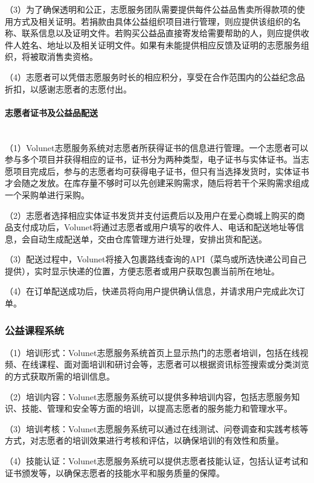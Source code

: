 （3）为了确保透明和公正，志愿服务团队需要提供每件公益品售卖所得款项的使用方式及相关证明。若捐款由具体公益组织项目进行管理，则应提供该组织的名称、联系信息以及证明文件。若购买公益品直接寄发给需要帮助的人，则应提供收件人姓名、地址以及相关证明文件。如果有未能提供相应反馈及证明的志愿服务组织，将被取消售卖资格。

（4）志愿者可以凭借志愿服务时长的相应积分，享受在合作范围内的公益纪念品折扣，以感谢志愿者的志愿付出。


\paragraph{志愿者证书及公益品配送}~{}
\\

（1）Volunet志愿服务系统对志愿者所获得证书的信息进行管理。一个志愿者可以参与多个项目并获得相应的证书，证书分为两种类型，电子证书与实体证书。当志愿项目完成后，参与的志愿者均可获得电子证书，但只有当选择发货时，实体证书才会随之发放。在库存量不够时可以先创建采购需求，随后将若干个采购需求组成一个采购单进行采购。

（2）志愿者选择相应实体证书发货并支付运费后以及用户在爱心商城上购买的商品支付成功后，Volunet将通过志愿者或用户填写的收件人、电话和配送地址等信息，会自动生成配送单，交由仓库管理方进行处理，安排出货和配送。

（3）配送过程中，Volunet将接入包裹路线查询的API（菜鸟或所选快递公司自己提供），实时显示快递的位置，方便志愿者或用户获取包裹当前所在地址。

（4）在订单配送成功后，快递员将向用户提供确认信息，并请求用户完成此次订单。


\subsubsection{公益课程系统}

（1）培训形式：Volunet志愿服务系统首页上显示热门的志愿者培训，包括在线视频、在线课程、面对面培训和研讨会等，志愿者可以根据资讯标签搜索或分类浏览的方式获取所需的培训信息。

（2）培训内容：Volunet志愿服务系统可以提供多种培训内容，包括志愿服务知识、技能、管理和安全等方面的培训，以提高志愿者的服务能力和管理水平。

（3）培训考核：Volunet志愿服务系统可以通过在线测试、问卷调查和实践考核等方式，对志愿者的培训效果进行考核和评估，以确保培训的有效性和质量。

（4）技能认证：Volunet志愿服务系统可以提供志愿者技能认证，包括认证考试和证书颁发等，以确保志愿者的技能水平和服务质量的保障。


